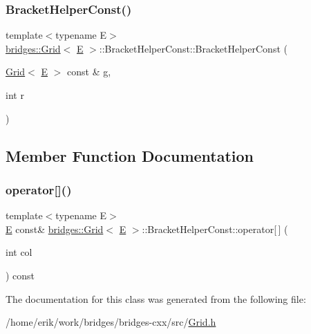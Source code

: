 \subsubsection{\texorpdfstring{Bracket\+Helper\+Const()}{BracketHelperConst()}}
{\footnotesize\ttfamily template$<$typename E$>$ \\
\hyperlink{classbridges_1_1_grid}{bridges\+::\+Grid}$<$ \hyperlink{namespacebridges_acfb0a4f7877d8f63de3e6862004c50eda3a3ea00cfc35332cedf6e5e9a32e94da}{E} $>$\+::Bracket\+Helper\+Const\+::\+Bracket\+Helper\+Const (\begin{DoxyParamCaption}\item[{\hyperlink{classbridges_1_1_grid}{Grid}$<$ \hyperlink{namespacebridges_acfb0a4f7877d8f63de3e6862004c50eda3a3ea00cfc35332cedf6e5e9a32e94da}{E} $>$ const \&}]{g,  }\item[{int}]{r }\end{DoxyParamCaption})\hspace{0.3cm}{\ttfamily [inline]}}



\subsection{Member Function Documentation}
\mbox{\label{classbridges_1_1_grid_1_1_bracket_helper_const_aef4accf6080a14a2146e13bd42dc9553}} 
\subsubsection{\texorpdfstring{operator[]()}{operator[]()}}
{\footnotesize\ttfamily template$<$typename E$>$ \\
\hyperlink{namespacebridges_acfb0a4f7877d8f63de3e6862004c50eda3a3ea00cfc35332cedf6e5e9a32e94da}{E} const\& \hyperlink{classbridges_1_1_grid}{bridges\+::\+Grid}$<$ \hyperlink{namespacebridges_acfb0a4f7877d8f63de3e6862004c50eda3a3ea00cfc35332cedf6e5e9a32e94da}{E} $>$\+::Bracket\+Helper\+Const\+::operator\mbox{[}$\,$\mbox{]} (\begin{DoxyParamCaption}\item[{int}]{col }\end{DoxyParamCaption}) const\hspace{0.3cm}{\ttfamily [inline]}}



The documentation for this class was generated from the following file\+:\begin{DoxyCompactItemize}
\item 
/home/erik/work/bridges/bridges-\/cxx/src/\hyperlink{_grid_8h}{Grid.\+h}\end{DoxyCompactItemize}
